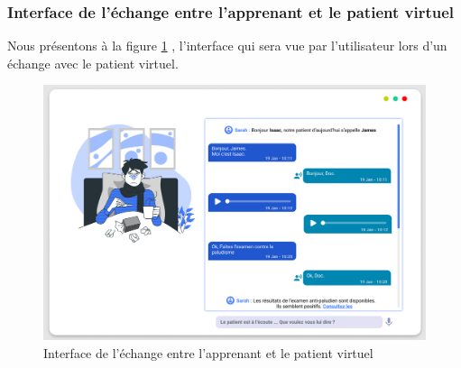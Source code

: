 \subsubsection{Interface de l'échange entre l'apprenant et le patient virtuel}
Nous présentons à la figure \ref{fig:echange} , l'interface qui sera vue par l'utilisateur lors d'un échange avec le patient virtuel.
\begin{figure}[H]
    \centering
    \includegraphics[width=\textwidth]{figures/patient-apprenant.png}
        \captionsetup{justification=centering}
    \caption{Interface de l'échange entre l'apprenant et le patient virtuel}
    \label{fig:echange}
\end{figure}